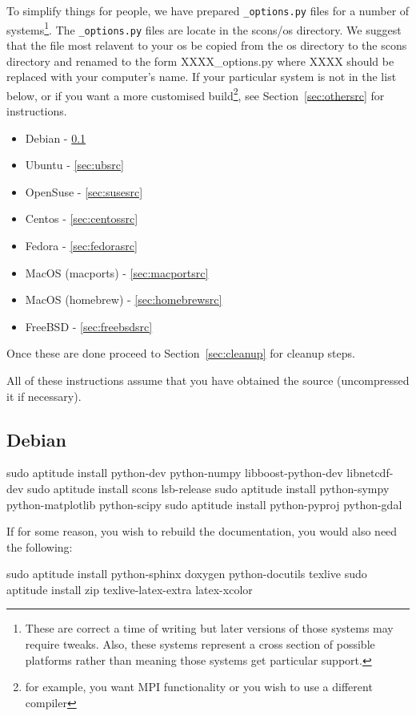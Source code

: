 To simplify things for people, we have prepared \texttt{_options.py} files for a number of 
systems\footnote{These are correct a time of writing but later versions of those systems may require tweaks. 
Also, these systems represent a cross section of possible platforms rather than meaning those systems get particular support.}.
The \texttt{_options.py} files are locate in the scons/os directory. We suggest that the file most relavent to your os 
be copied from the os directory to the scons directory and renamed to the form XXXX_options.py where XXXX should be replaced with your computer's name.
If your particular system is not in the list below, or if you want a more customised 
build\footnote{for example, you want MPI functionality or you wish to use a different compiler}, 
see Section~\ref{sec:othersrc} for instructions.
\begin{itemize}
 \item Debian - \ref{sec:debsrc}
 \item Ubuntu - \ref{sec:ubsrc}
 \item OpenSuse - \ref{sec:susesrc}
 \item Centos - \ref{sec:centossrc}
 \item Fedora - \ref{sec:fedorasrc}
 \item MacOS (macports) - \ref{sec:macportsrc}
 \item MacOS (homebrew) - \ref{sec:homebrewsrc}
 \item FreeBSD - \ref{sec:freebsdsrc}
\end{itemize}

Once these are done proceed to Section~\ref{sec:cleanup} for cleanup steps.

All of these instructions assume that you have obtained the source (uncompressed it if necessary).
\subsection{Debian}\label{sec:debsrc}

\begin{shellCode}
sudo aptitude install python-dev python-numpy libboost-python-dev libnetcdf-dev
sudo aptitude install scons lsb-release
sudo aptitude install python-sympy python-matplotlib python-scipy
sudo aptitude install python-pyproj python-gdal 
\end{shellCode}


\begin{optionalstep}
If for some reason, you wish to rebuild the documentation, you would also need the following:
\begin{shellCode}
sudo aptitude install python-sphinx doxygen python-docutils texlive 
sudo aptitude install zip texlive-latex-extra latex-xcolor 
\end{shellCode}
\end{optionalstep}

